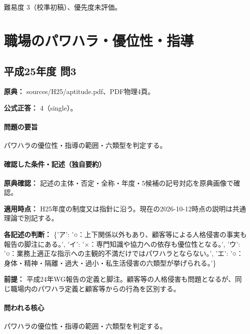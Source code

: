 \par 難易度 3（校準初稿）、優先度未評価。

\section{職場のパワハラ・優位性・指導}

\subsection{平成25年度 問3}
\label{q:h25-reg-apt-03}

\noindent\textbf{原典：} sources/H25/aptitude.pdf、PDF物理4頁。

\textbf{公式正答：} 4（single）。

\paragraph{問題の要旨} パワハラの優位性・指導の範囲・六類型を判定する。

\paragraph{確認した条件・記述（独自要約）}\mbox{}\par

\noindent\textbf{原典確認：} 記述の主体・否定・全称・年度・5候補の記号対応を原典画像で確認。\par

\noindent\textbf{適用時点：} H25年度の制度又は指針に沿う。現在の2026-10-12時点の説明は共通理論で別記する。\par

\noindent\textbf{各記述の判断：} \{'ア': '○：上下関係以外もあり、顧客等による人格侵害の事実も報告の脚注にある。', 'イ': '×：専門知識や協力への依存も優位性となる。', 'ウ': '○：業務上適正な指示への主観的不満だけではパワハラとならない。', 'エ': '○：身体・精神・隔離・過大・過小・私生活侵害の六類型が挙げられる。'\}\par

\noindent\textbf{前提：} 平成24年WG報告の定義と脚注。顧客等の人格侵害も問題となるが、同じ職場内のパワハラ定義と顧客等からの行為を区別する。\par

\paragraph{問われる核心} パワハラの優位性・指導の範囲・六類型を判定する。


